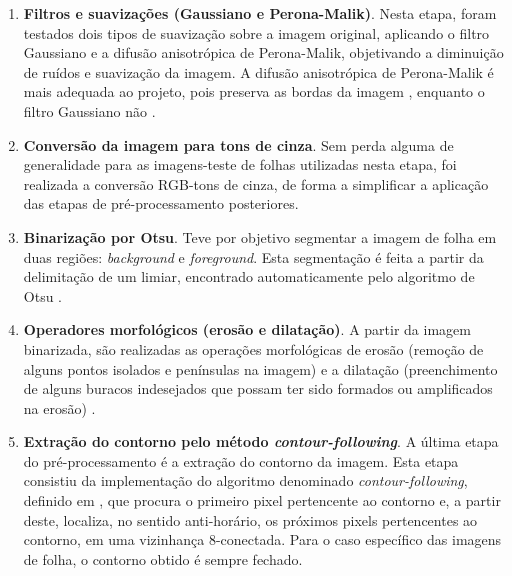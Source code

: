 \begin{enumerate}
	
	\item \textbf{Filtros e suavizações (Gaussiano e Perona-Malik)}. Nesta etapa, foram testados dois tipos de suavização sobre a imagem original, aplicando o filtro Gaussiano e a difusão anisotrópica de Perona-Malik, objetivando a diminuição de ruídos e suavização da imagem. A difusão anisotrópica de Perona-Malik é mais adequada ao projeto, pois preserva as bordas da imagem \cite{hidalgo2013}, enquanto o filtro Gaussiano não \cite{szeliski2011}.
	
	\item \textbf{Conversão da imagem para tons de cinza}. Sem perda alguma de generalidade para as imagens-teste de folhas utilizadas nesta etapa, foi realizada a conversão RGB-tons de cinza, de forma a simplificar a aplicação das etapas de pré-processamento posteriores. 
	
	\item \textbf{Binarização por Otsu}. Teve por objetivo segmentar a imagem de folha em duas regiões: \textit{background} e \textit{foreground}. Esta segmentação é feita a partir da delimitação de um limiar, encontrado automaticamente pelo algoritmo de Otsu \cite{burger2016}.
	
	\item \textbf{Operadores morfológicos (erosão e dilatação)}. A partir da imagem binarizada, são realizadas as operações morfológicas de erosão (remoção de alguns pontos isolados e penínsulas na imagem) e a dilatação (preenchimento de alguns buracos indesejados que possam ter sido formados ou amplificados na erosão) \cite{serra1984}.
	
	\item \textbf{Extração do contorno pelo método \textit{contour-following}}. A última etapa do pré-processamento é a extração do contorno da imagem. Esta etapa consistiu da implementação do algoritmo denominado \textit{contour-following}, definido em \cite{costajr2009}, que procura o primeiro pixel pertencente ao contorno e, a partir deste, localiza, no sentido anti-horário, os próximos pixels pertencentes ao contorno, em uma vizinhança 8-conectada. Para o caso específico das imagens de folha, o contorno obtido é sempre fechado. 
\end{enumerate}

